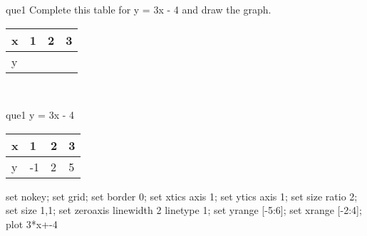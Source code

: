 \documentclass[13.5pt, varwidth=true]{beamer}
\begin{document}
\begin{frame}[shrink=19,fragile]
	\begin{beamercolorbox}[rounded=true, left, shadow=true,wd=14.8cm]{que1}
		 Complete this table for y = 3x - 4 and draw the graph. \\[0.3cm] \renewcommand{\arraystretch}{1.2}\begin{tabular}{|C|C|C|C|} \hline x & 1 & 2 & 3 \\ \hline y & & & \\ \hline \end{tabular}\\[0.3cm]
	\end{beamercolorbox}
\end{frame}
\begin{frame}[shrink=19,fragile]
	\begin{beamercolorbox}[rounded=true, left, shadow=true,wd=14.8cm]{que1}
		y = 3x - 4\renewcommand{\arraystretch}{1.2}\begin{tabular}{|C|C|C|C|} \hline x & 1 & 2 & 3 \\ \hline y & -1 & 2 & 5\\ \hline \end{tabular}\begin{gnuplot}[terminal=pdf] set nokey; set grid; set border 0; set xtics axis 1; set ytics axis 1; set size ratio 2; set size 1,1; set zeroaxis linewidth 2 linetype 1; set yrange [-5:6]; set xrange [-2:4]; plot 3*x+-4 \end{gnuplot}
	\end{beamercolorbox}
\end{frame}
\end{document}
